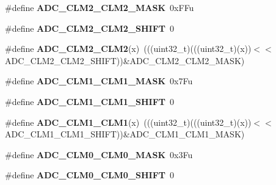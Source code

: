 \begin{DoxyCompactItemize}
\item 
\#define {\bfseries A\+D\+C\+\_\+\+C\+L\+M2\+\_\+\+C\+L\+M2\+\_\+\+M\+A\+SK}~0x\+F\+Fu\hypertarget{group__ADC__Register__Masks_ga815d6f1bf2d38384c8fd0dd4f07f7a08}{}\label{group__ADC__Register__Masks_ga815d6f1bf2d38384c8fd0dd4f07f7a08}

\item 
\#define {\bfseries A\+D\+C\+\_\+\+C\+L\+M2\+\_\+\+C\+L\+M2\+\_\+\+S\+H\+I\+FT}~0\hypertarget{group__ADC__Register__Masks_ga945ed262c088eecda09d679df33ab193}{}\label{group__ADC__Register__Masks_ga945ed262c088eecda09d679df33ab193}

\item 
\#define {\bfseries A\+D\+C\+\_\+\+C\+L\+M2\+\_\+\+C\+L\+M2}(x)~(((uint32\+\_\+t)(((uint32\+\_\+t)(x))$<$$<$A\+D\+C\+\_\+\+C\+L\+M2\+\_\+\+C\+L\+M2\+\_\+\+S\+H\+I\+FT))\&A\+D\+C\+\_\+\+C\+L\+M2\+\_\+\+C\+L\+M2\+\_\+\+M\+A\+SK)\hypertarget{group__ADC__Register__Masks_ga2366c7a7142228c95c81d4d11c90b2b1}{}\label{group__ADC__Register__Masks_ga2366c7a7142228c95c81d4d11c90b2b1}

\item 
\#define {\bfseries A\+D\+C\+\_\+\+C\+L\+M1\+\_\+\+C\+L\+M1\+\_\+\+M\+A\+SK}~0x7\+Fu\hypertarget{group__ADC__Register__Masks_gaf576a4eb27b1478ea37a1b35bf6b869f}{}\label{group__ADC__Register__Masks_gaf576a4eb27b1478ea37a1b35bf6b869f}

\item 
\#define {\bfseries A\+D\+C\+\_\+\+C\+L\+M1\+\_\+\+C\+L\+M1\+\_\+\+S\+H\+I\+FT}~0\hypertarget{group__ADC__Register__Masks_gae83765be6a54aab249c89a0f47afb023}{}\label{group__ADC__Register__Masks_gae83765be6a54aab249c89a0f47afb023}

\item 
\#define {\bfseries A\+D\+C\+\_\+\+C\+L\+M1\+\_\+\+C\+L\+M1}(x)~(((uint32\+\_\+t)(((uint32\+\_\+t)(x))$<$$<$A\+D\+C\+\_\+\+C\+L\+M1\+\_\+\+C\+L\+M1\+\_\+\+S\+H\+I\+FT))\&A\+D\+C\+\_\+\+C\+L\+M1\+\_\+\+C\+L\+M1\+\_\+\+M\+A\+SK)\hypertarget{group__ADC__Register__Masks_gac77d03fd2d07583049ec6496092b3a40}{}\label{group__ADC__Register__Masks_gac77d03fd2d07583049ec6496092b3a40}

\item 
\#define {\bfseries A\+D\+C\+\_\+\+C\+L\+M0\+\_\+\+C\+L\+M0\+\_\+\+M\+A\+SK}~0x3\+Fu\hypertarget{group__ADC__Register__Masks_ga2f9f36fb3b4eceab2198582865dc5b14}{}\label{group__ADC__Register__Masks_ga2f9f36fb3b4eceab2198582865dc5b14}

\item 
\#define {\bfseries A\+D\+C\+\_\+\+C\+L\+M0\+\_\+\+C\+L\+M0\+\_\+\+S\+H\+I\+FT}~0\hypertarget{group__ADC__Register__Masks_gaf5a5fd710a47f83c5ee3fd083f430a66}{}\label{group__ADC__Register__Masks_gaf5a5fd710a47f83c5ee3fd083f430a66}


\end{DoxyCompactItemize}
